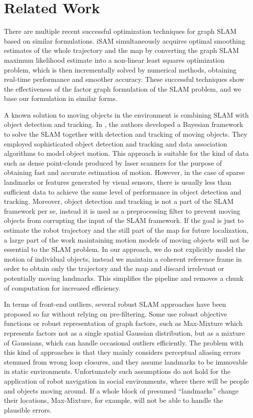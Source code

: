 \section{Related Work}

There are multiple recent successful optimization techniques for graph SLAM
based on similar formulations. iSAM\cite{isam} simultaneously acquires optimal
smoothing estimates of the whole trajectory and the map by converting the
graph SLAM maximum likelihood estimate into a non-linear least squares
optimization problem, which is then incrementally solved by numerical methods,
obtaining real-time performance and smoother accuracy. These successful
techniques show the effectiveness of the factor graph formulation of the SLAM
problem, and we base our formulation in similar forms.

A known solution to moving objects in the environment is combining SLAM with
object detection and tracking. In \cite{wang2003online}, the authors developed a
Bayesian framework to solve the SLAM together with detection and tracking of
moving objects. They employed sophisticated object detection and tracking and
data association algorithms to model object motion. This approach is suitable
for the kind of data such as dense point-clouds produced by laser scanners for
the purpose of obtaining fast and accurate estimation of motion. However, in
the case of sparse landmarks or features generated by visual sensors, there is
usually less than sufficient data to achieve the same level of performance in
object detection and tracking.  Moreover, object detection and tracking is not
a part of the SLAM framework per se, instead it is used as a preprocessing
filter to prevent moving objects from corrupting the input of the SLAM
framework. If the goal is just to estimate the robot trajectory and the still
part of the map for future localization, a large part of the work maintaining
motion models of moving objects will not be essential to the SLAM problem. In
our approach, we do not explicitly model the motion of individual objects,
instead we maintain a coherent reference frame in order to obtain only the
trajectory and the map and discard irrelevant or potentially moving landmarks.
This simplifies the pipeline and removes a chunk of computation for increased
efficiency.

In terms of front-end outliers, several robust SLAM approaches have been
proposed so far without relying on pre-filtering. Some use robust objective
functions or robust representation of graph factors, such as
Max-Mixture\cite{mm} which represents factors not as a single spatial
Gaussian distribution, but as a mixture of Gaussians, which can handle
occasional outliers efficiently. The problem with this kind of approaches is
that they mainly considers perceptual aliasing errors stemmed from wrong loop
closures, and they assume landmarks to be immovable in static environments.
Unfortunately such assumptions do not hold for the application of robot
navigation in social environments, where there will be people and objects
moving around. If a whole block of presumed ``landmarks'' change their
locations, Max-Mixture, for example, will not be able to handle the plausible
errors.

